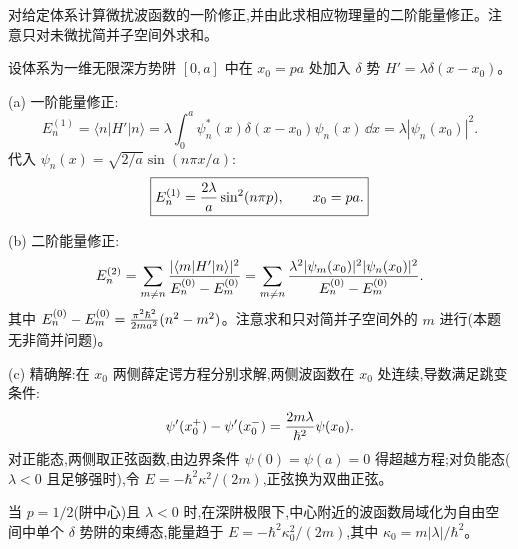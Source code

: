 \begin{question}
对给定体系计算微扰波函数的一阶修正,并由此求相应物理量的二阶能量修正。注意只对未微扰简并子空间外求和。
\end{question}
\begin{solution}
设体系为一维无限深方势阱 $[0,a]$ 中在 $x_0=pa$ 处加入 $\delta$ 势 $H'=\lambda\delta(x-x_0)$。

(a) 一阶能量修正:
\[
E_n^{(1)} = \langle n|H'|n\rangle = \lambda\int_0^a \psi_n^*(x)\delta(x-x_0)\psi_n(x)\,\dd x = \lambda|\psi_n(x_0)|^2.
\]
代入 $\psi_n(x)=\sqrt{2/a}\sin(n\pi x/a)$:
\[
\boxed{E_n^{(1)} = {2\lambda\over a}\sin^2(n\pi p),\qquad x_0=pa.}
\]

(b) 二阶能量修正:
\[
E_n^{(2)} = \sum_{m\ne n} {|\langle m|H'|n\rangle|^2\over E_n^{(0)}-E_m^{(0)}}
= \sum_{m\ne n} {\lambda^2 |\psi_m(x_0)|^2|\psi_n(x_0)|^2\over E_n^{(0)}-E_m^{(0)}}.
\]
其中 $E_n^{(0)}-E_m^{(0)} = {\pi^2\hbar^2\over2ma^2}(n^2-m^2)$。注意求和只对简并子空间外的 $m$ 进行(本题无非简并问题)。

(c) 精确解:在 $x_0$ 两侧薛定谔方程分别求解,两侧波函数在 $x_0$ 处连续,导数满足跳变条件:
\[
\psi'(x_0^+)-\psi'(x_0^-) = {2m\lambda\over\hbar^2}\psi(x_0).
\]
对正能态,两侧取正弦函数,由边界条件 $\psi(0)=\psi(a)=0$ 得超越方程;对负能态($\lambda<0$ 且足够强时),令 $E=-\hbar^2\kappa^2/(2m)$,正弦换为双曲正弦。

当 $p=1/2$(阱中心)且 $\lambda<0$ 时,在深阱极限下,中心附近的波函数局域化为自由空间中单个 $\delta$ 势阱的束缚态,能量趋于 $E=-\hbar^2\kappa_0^2/(2m)$,其中 $\kappa_0 = m|\lambda|/\hbar^2$。
\end{solution}


